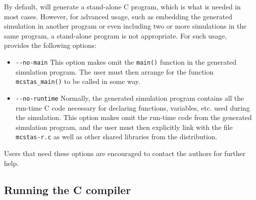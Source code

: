 By default, \mcs will generate a stand-alone C program, which is what is needed
in most cases. However, for advanced usage, such as embedding the generated
simulation in another program or even including two or more simulations in the
same program, a stand-alone program is not appropriate.
For such usage, \mcs provides the following options:
\begin{itemize}
\item \verb+--no-main+ This option makes \mcs omit the \verb+main()+ function
  in the generated simulation program. The user must then arrange for the
  function \verb+mcstas_main()+ to be called in some way.
\item \verb+--no-runtime+ Normally, the
  generated simulation program contains all the run-time C code necessary for
  declaring functions, variables, etc. used during the simulation.  This
  option makes \mcs omit the run-time code from the generated
  simulation program, and the user must then explicitly link with the file
  \verb+mcstas-r.c+ as well as other shared libraries
  from the \MCS distribution.
\end{itemize}
Users that need these options are encouraged to contact the authors for further
help.


\subsection{Running the C compiler}
\label{s:compile}

